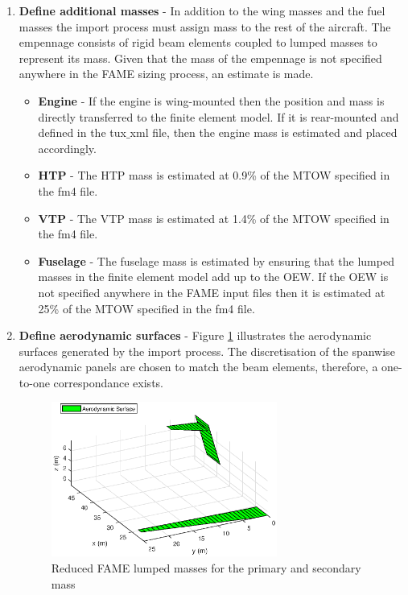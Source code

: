 \begin{enumerate}
\item \textbf{Define additional masses} - In addition to the wing masses and the fuel masses the import process must assign mass to the rest of the aircraft. The empennage consists of rigid beam elements coupled to lumped masses to represent its mass. Given that the mass of the empennage is not specified anywhere in the FAME sizing process, an estimate is made. 

\begin{itemize}
\item \textbf{Engine} - If the engine is wing-mounted then the position and mass is directly transferred to the finite element model. If it is rear-mounted and defined in the tux$\_$xml file, then the engine mass is estimated and placed accordingly. 
\item \textbf{HTP} - The HTP mass is estimated at 0.9\% of the MTOW specified in the fm4 file.
\item \textbf{VTP} - The VTP mass is estimated at 1.4\% of the MTOW specified in the fm4 file.
\item \textbf{Fuselage} - The fuselage mass is estimated by ensuring that the lumped masses in the finite element model add up to the OEW. If the OEW is not specified anywhere in the FAME input files then it is estimated at 25\% of the MTOW specified in the fm4 file.
\end{itemize}

\item \textbf{Define aerodynamic surfaces} - Figure \ref{fig:FAMEAerodynamicSurface} illustrates the aerodynamic surfaces generated by the import process. The discretisation of the spanwise aerodynamic panels are chosen to match the beam elements, therefore, a one-to-one correspondance exists.  

\begin{figure}[h!]
\centering
\includegraphics[width = 0.7\textwidth]{FAMEAerodynamicSurface}
\caption{Reduced FAME lumped masses for the primary and secondary mass}\label{fig:FAMEAerodynamicSurface}
\end{figure}


\end{enumerate}
